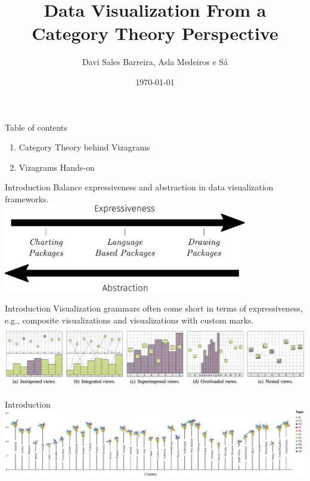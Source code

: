 \documentclass[aspectratio=169,xcolor=dvipsnames,10pt]{beamer}
\title{Data Visualization From a Category Theory Perspective}
\subtitle{}
\author{Davi Sales Barreira, Asla Medeiros e Sá}
\institute
{
    FGV - EMAp, IMPATech
}
\date{\today} %
\theoremstyle{definition}
\begin{document}
\begin{frame}
    \titlepage
\end{frame}

\begin{frame}{Table of contents}
    \begin{enumerate}
        \item Category Theory behind Vizagrams
        \item Vizagrams Hands-on
    \end{enumerate}
\end{frame}

\begin{frame}{Introduction}
    \centering
    Balance expressiveness and abstraction in data visualization frameworks.
    \\[1em]
    \includegraphics[width=0.8\textwidth]{./figures/expressiveness.pdf}
\end{frame}

\begin{frame}{Introduction}
    \centering
    Visualization grammars often come short in terms of expressiveness, e.g., composite visualizations and visualizations with custom marks.
    \\[1em]
    \includegraphics[width=\textwidth]{figs/compvis.png}
\end{frame}

\begin{frame}{Introduction}
    \centering
    \includegraphics[width=\textwidth]{./figs/moritz.pdf}
\end{frame}
\end{document}
